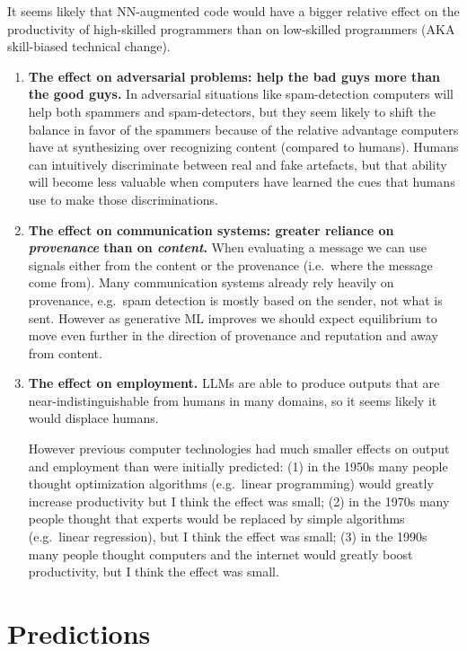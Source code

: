 \documentclass[
  11pt,
  letterpaper,
  DIV=11,
  numbers=noendperiod,
  oneside]{scrartcl}
\begin{document}
It seems likely that NN-augmented code would have a bigger relative
effect on the productivity of high-skilled programmers than on
low-skilled programmers (AKA skill-biased technical change).

\begin{enumerate}
\def\labelenumi{\arabic{enumi}.}
\setcounter{enumi}{8}
\item
  \textbf{The effect on adversarial problems: help the bad guys more
  than the good guys.} In adversarial situations like spam-detection
  computers will help both spammers and spam-detectors, but they seem
  likely to shift the balance in favor of the spammers because of the
  relative advantage computers have at synthesizing over recognizing
  content (compared to humans). Humans can intuitively discriminate
  between real and fake artefacts, but that ability will become less
  valuable when computers have learned the cues that humans use to make
  those discriminations.
\item
  \textbf{The effect on communication systems: greater reliance on
  \emph{provenance} than on \emph{content}.} When evaluating a message
  we can use signals either from the content or the provenance
  (i.e.~where the message come from). Many communication systems already
  rely heavily on provenance, e.g.~spam detection is mostly based on the
  sender, not what is sent. However as generative ML improves we should
  expect equilibrium to move even further in the direction of provenance
  and reputation and away from content.
\item
  \textbf{The effect on employment.} LLMs are able to produce outputs
  that are near-indistinguishable from humans in many domains, so it
  seems likely it would displace humans.

  However previous computer technologies had much smaller effects on
  output and employment than were initially predicted: (1) in the 1950s
  many people thought optimization algorithms (e.g.~linear programming)
  would greatly increase productivity but I think the effect was small;
  (2) in the 1970s many people thought that experts would be replaced by
  simple algorithms (e.g.~linear regression), but I think the effect was
  small; (3) in the 1990s many people thought computers and the internet
  would greatly boost productivity, but I think the effect was small.
\end{enumerate}

\hypertarget{predictions}{%
\section{Predictions}\label{predictions}}
\end{document}

